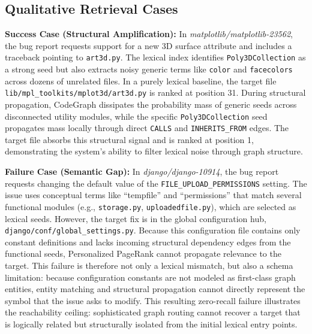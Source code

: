 \subsection{Qualitative Retrieval Cases}

\textbf{Success Case (Structural Amplification):} In \textit{matplotlib/matplotlib-23562}, the bug report requests support for a new 3D surface attribute and includes a traceback pointing to \texttt{art3d.py}. The lexical index identifies \texttt{Poly3DCollection} as a strong seed but also extracts noisy generic terms like \texttt{color} and \texttt{facecolors} across dozens of unrelated files. In a purely lexical baseline, the target file \texttt{lib/mpl\_toolkits/mplot3d/art3d.py} is ranked at position 31. During structural propagation, CodeGraph dissipates the probability mass of generic seeds across disconnected utility modules, while the specific \texttt{Poly3DCollection} seed propagates mass locally through direct \texttt{CALLS} and \texttt{INHERITS\_FROM} edges. The target file absorbs this structural signal and is ranked at position 1, demonstrating the system's ability to filter lexical noise through graph structure.

\textbf{Failure Case (Semantic Gap):} In \textit{django/django-10914}, the bug report requests changing the default value of the \texttt{FILE\_UPLOAD\_PERMISSIONS} setting. The issue uses conceptual terms like ``tempfile'' and ``permissions'' that match several functional modules (e.g., \texttt{storage.py}, \texttt{uploadedfile.py}), which are selected as lexical seeds. However, the target fix is in the global configuration hub, \texttt{django/conf/global\_settings.py}. Because this configuration file contains only constant definitions and lacks incoming structural dependency edges from the functional seeds, Personalized PageRank cannot propagate relevance to the target. This failure is therefore not only a lexical mismatch, but also a schema limitation: because configuration constants are not modeled as first-class graph entities, entity matching and structural propagation cannot directly represent the symbol that the issue asks to modify. This resulting zero-recall failure illustrates the reachability ceiling: sophisticated graph routing cannot recover a target that is logically related but structurally isolated from the initial lexical entry points.
